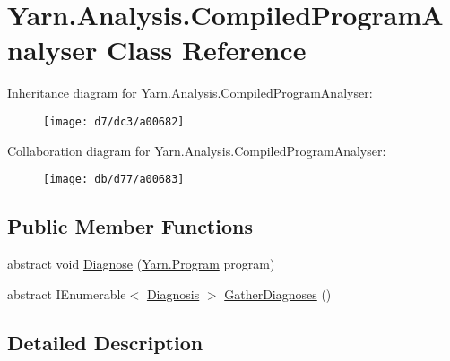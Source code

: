 \hypertarget{a00031}{\section{Yarn.\-Analysis.\-Compiled\-Program\-Analyser Class Reference}
\label{a00031}
}


Inheritance diagram for Yarn.\-Analysis.\-Compiled\-Program\-Analyser\-:
\nopagebreak
\begin{figure}[H]
\begin{center}
\leavevmode
\texttt{[image: d7/dc3/a00682]}
\end{center}
\end{figure}


Collaboration diagram for Yarn.\-Analysis.\-Compiled\-Program\-Analyser\-:
\nopagebreak
\begin{figure}[H]
\begin{center}
\leavevmode
\texttt{[image: db/d77/a00683]}
\end{center}
\end{figure}
\subsection*{Public Member Functions}
\begin{DoxyCompactItemize}
\item 
abstract void \hyperlink{a00031_aba4a36cb823b11ee491074e26477d084}{Diagnose} (\hyperlink{a00124}{Yarn.\-Program} program)
\item 
abstract I\-Enumerable$<$ \hyperlink{a00069}{Diagnosis} $>$ \hyperlink{a00031_afe059a2ceeabe50380b000420e512bd6}{Gather\-Diagnoses} ()
\end{DoxyCompactItemize}


\subsection{Detailed Description}


